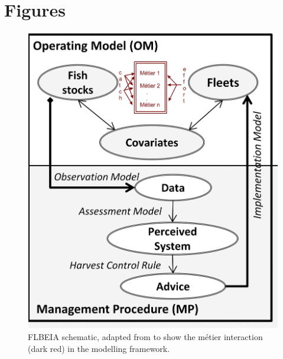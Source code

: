 \documentclass[12pt, halfline, a4paper]{ouparticle}
\begin{document}
\section{Figures}

\begin{figure}[!ht]
	\centering
	\includegraphics[width=0.6\linewidth]{figures/FLBEIA}
	\caption{FLBEIA schematic, adapted from \cite{Garcia2017} to show the
		métier interaction (dark red) in the modelling framework.} 
	\label{fig:flbeia}
\end{figure}	
\end{document}

